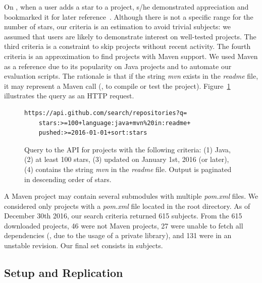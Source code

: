 On \github{}, when a user adds a star to a project, s/he demonstrated
appreciation and bookmarked it for later
reference~\cite{github-stars}.  Although there is not a specific range
for the number of stars, our criteria is an estimation to avoid
trivial subjects: we assumed that \github{} users are likely to
demonstrate interest on well-tested projects. The third criteria is a
constraint to skip projects without recent activity. The fourth
criteria is an approximation to find projects with Maven support. We
used Maven as a reference due to its popularity on Java projects and
to automate our evaluation scripts. The rationale is that if the
string \emph{mvn} exists in the \emph{readme} file, it may represent a
Maven call (\eg, to compile or test the project).
Figure~\ref{fig:subject-query} illustrates the query as an HTTP
request.

\begin{figure}[h!]
\centering
\scriptsize
{}
\begin{lstlisting}
https://api.github.com/search/repositories?q=
    stars:>=100+language:java+mvn%20in:readme+
    pushed:>=2016-01-01+sort:stars

\end{lstlisting}
    \caption{\label{fig:subject-query} Query to the \github{} API for
    projects with the following criteria: (1) Java, (2) at least 100
    stars, (3) updated on January 1st, 2016 (or later), (4) contains
    the string \emph{mvn} in the \emph{readme} file. Output is
    paginated in descending order of stars.}
\end{figure}

A Maven project may contain several submodules with multiple
\emph{pom.xml} files. We considered only projects with a
\emph{pom.xml} file located in the root directory.  As of December
30th 2016, our search criteria returned 615 subjects. From the 615
downloaded projects, 46 were not Maven projects, 27 were unable to
fetch all dependencies (\eg, due to the usage of a private library),
and 131 were in an unstable revision. Our final set consists in
\numSubjs{} subjects.

\subsection{Setup and Replication}
\label{sec:setup}

